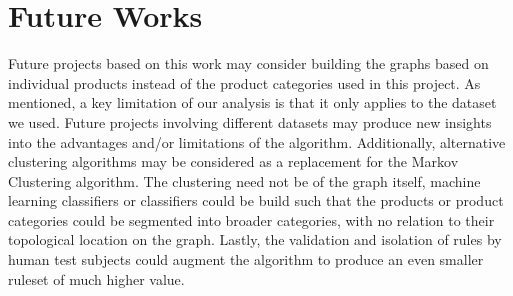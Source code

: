 \section{Future Works}
Future projects based on this work may consider building the graphs based on individual products instead of the product categories used in this project. As mentioned, a key limitation of our analysis is that it only applies to the dataset we used. Future projects involving different datasets may produce new insights into the advantages and/or limitations of the algorithm. Additionally, alternative clustering algorithms may be considered as a replacement for the Markov Clustering algorithm. The clustering need not be of the graph itself, machine learning classifiers or classifiers could be build such that the products or product categories could be segmented into broader categories, with no relation to their topological location on the graph. Lastly, the validation and isolation of rules by human test subjects could augment the algorithm to produce an even smaller ruleset of much higher value.
